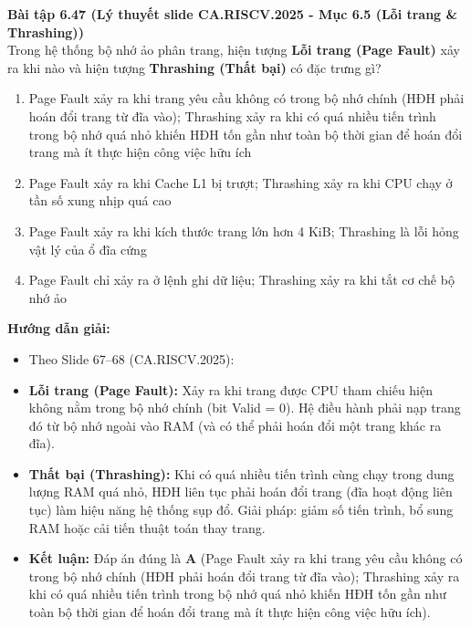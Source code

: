 \textbf{Bài tập 6.47 (Lý thuyết slide CA.RISCV.2025 - Mục 6.5 (Lỗi trang \& Thrashing))}\\
Trong hệ thống bộ nhớ ảo phân trang, hiện tượng \textbf{Lỗi trang (Page Fault)} xảy ra khi nào và hiện tượng \textbf{Thrashing (Thất bại)} có đặc trưng gì?
\begin{enumerate}[label=\Alph*.]
    \item Page Fault xảy ra khi trang yêu cầu không có trong bộ nhớ chính (HĐH phải hoán đổi trang từ đĩa vào); Thrashing xảy ra khi có quá nhiều tiến trình trong bộ nhớ quá nhỏ khiến HĐH tốn gần như toàn bộ thời gian để hoán đổi trang mà ít thực hiện công việc hữu ích
    \item Page Fault xảy ra khi Cache L1 bị trượt; Thrashing xảy ra khi CPU chạy ở tần số xung nhịp quá cao
    \item Page Fault xảy ra khi kích thước trang lớn hơn 4 KiB; Thrashing là lỗi hỏng vật lý của ổ đĩa cứng
    \item Page Fault chỉ xảy ra ở lệnh ghi dữ liệu; Thrashing xảy ra khi tắt cơ chế bộ nhớ ảo
\end{enumerate}
\textbf{Hướng dẫn giải:}
\begin{itemize}
    \item Theo Slide 67--68 (CA.RISCV.2025):
    \item \textbf{Lỗi trang (Page Fault):} Xảy ra khi trang được CPU tham chiếu hiện không nằm trong bộ nhớ chính (bit Valid = 0). Hệ điều hành phải nạp trang đó từ bộ nhớ ngoài vào RAM (và có thể phải hoán đổi một trang khác ra đĩa).
    \item \textbf{Thất bại (Thrashing):} Khi có quá nhiều tiến trình cùng chạy trong dung lượng RAM quá nhỏ, HĐH liên tục phải hoán đổi trang (đĩa hoạt động liên tục) làm hiệu năng hệ thống sụp đổ. Giải pháp: giảm số tiến trình, bổ sung RAM hoặc cải tiến thuật toán thay trang.
    \item \textbf{Kết luận:} Đáp án đúng là \textbf{A} (Page Fault xảy ra khi trang yêu cầu không có trong bộ nhớ chính (HĐH phải hoán đổi trang từ đĩa vào); Thrashing xảy ra khi có quá nhiều tiến trình trong bộ nhớ quá nhỏ khiến HĐH tốn gần như toàn bộ thời gian để hoán đổi trang mà ít thực hiện công việc hữu ích).
\end{itemize}

